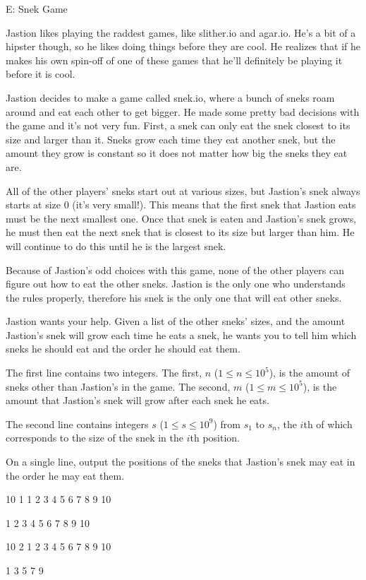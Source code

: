 \begin{problem}{E: Snek Game}

Jastion likes playing the raddest games, like slither.io and agar.io.
He's a bit of a hipster though, so he likes doing things before they are cool.
He realizes that if he makes his own spin-off of one of these games that he'll definitely be playing it before it is cool.

Jastion decides to make a game called snek.io, where a bunch of sneks roam around and eat each other to get bigger.
He made some pretty bad decisions with the game and it's not very fun.
First, a snek can only eat the snek closest to its size and larger than it.
Sneks grow each time they eat another snek, but the amount they grow is constant so it does not matter how big the sneks they eat are.

All of the other players' sneks start out at various sizes, but Jastion's snek always starts at size $0$ (it's very small!).
This means that the first snek that Jastion eats must be the next smallest one.
Once that snek is eaten and Jastion's snek grows, he must then eat the next snek that is closest to its size but larger than him.
He will continue to do this until he is the largest snek.

Because of Jastion's odd choices with this game, none of the other players can figure out how to eat the other sneks.
Jastion is the only one who understands the rules properly, therefore his snek is the only one that will eat other sneks.

Jastion wants your help.
Given a list of the other sneks' sizes, and the amount Jastion's snek will grow each time he eats a snek, he wants you to tell him which sneks he should eat and the order he should eat them.
\end{problem}

\begin{formalin}
The first line contains two integers. The first, $n$ ($1 \leq n \leq 10^5$), is the amount of sneks other than Jastion's in the game.
The second, $m$ ($1 \leq m \leq 10^5$), is the amount that Jastion's snek will grow after each snek he eats.

The second line contains integers $s$ ($1 \leq s \leq 10^9$) from $s_1$ to $s_n$, the $i$th of which corresponds to the size of the snek in the $i$th position.
\end{formalin}

\begin{formalout}
On a single line, output the positions of the sneks that Jastion's snek may eat in the order he may eat them.
\end{formalout}

\begin{datain}
10 1
1 2 3 4 5 6 7 8 9 10
\end{datain}
\begin{dataout}
1 2 3 4 5 6 7 8 9 10
\end{dataout}

\begin{datain}
10 2
1 2 3 4 5 6 7 8 9 10
\end{datain}
\begin{dataout}
1 3 5 7 9
\end{dataout}
